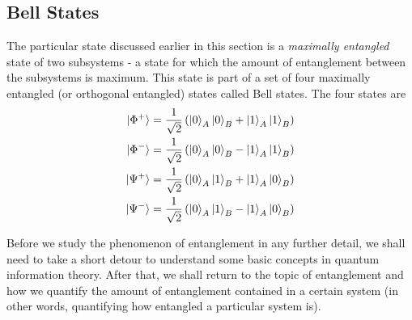 \subsection{Bell States}
\par The particular state discussed earlier in this section is a \textit{maximally entangled} state of two subsystems - a state for which the amount of entanglement between the subsystems is maximum. This state is part of a set of four maximally entangled (or orthogonal entangled) states called Bell states. The four states are
\begin{align*}
\ket{\Phi^+} &= \frac{1}{\sqrt{2}} \left( \ket{0}_A \ket{0}_B + \ket{1}_A \ket{1}_B \right) \\
\ket{\Phi^-} &= \frac{1}{\sqrt{2}} \left( \ket{0}_A \ket{0}_B - \ket{1}_A \ket{1}_B \right) \\
\ket{\Psi^+} &= \frac{1}{\sqrt{2}} \left( \ket{0}_A \ket{1}_B + \ket{1}_A \ket{0}_B \right) \\
\ket{\Psi^-} &= \frac{1}{\sqrt{2}} \left( \ket{0}_A \ket{1}_B - \ket{1}_A \ket{0}_B \right)
\end{align*}
\par Before we study the phenomenon of entanglement in any further detail, we shall need to take a short detour to understand some basic concepts in quantum information theory. After that, we shall return to the topic of entanglement and how we quantify the amount of entanglement contained in a certain system (in other words, quantifying how entangled a particular system is).

